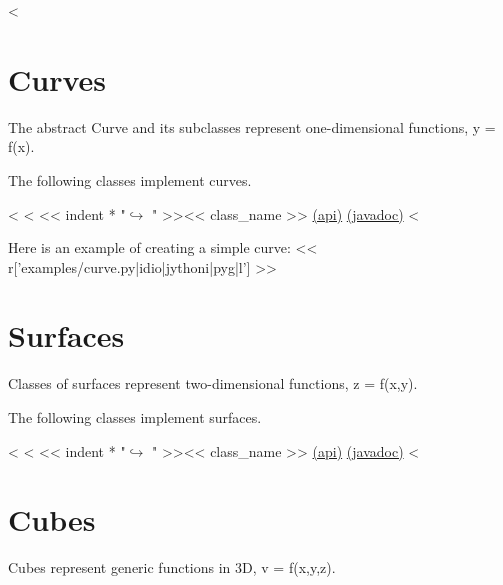 <%

\section{Curves}

The abstract Curve and its subclasses represent one-dimensional functions, y = f(x).

The following classes implement curves.

\begin{fullwidth}
<%
<%
<< indent * "$\hookrightarrow$ " >><< class_name >> \href{http://docs-static.hq.opengamma.com/0.7.0/analytics/api/<< package_name >>.html#class-<<class_name>>}{(api)} \href{http://docs-static.hq.opengamma.com/0.7.0/java/javadocs/<< class_name.replace(".","/") >>.html}{(javadoc)}
<%
\end{fullwidth}

Here is an example of creating a simple curve:
<< r['examples/curve.py|idio|jythoni|pyg|l'] >>

\section{Surfaces}

Classes of surfaces represent two-dimensional functions, z = f(x,y).

The following classes implement surfaces.

\begin{fullwidth}
<%
<%
<< indent * "$\hookrightarrow$ " >><< class_name >> \href{http://docs-static.hq.opengamma.com/0.7.0/analytics/api/<< package_name >>.html#class-<<class_name>>}{(api)} \href{http://docs-static.hq.opengamma.com/0.7.0/java/javadocs/<< class_name.replace(".","/") >>.html}{(javadoc)}
<%
\end{fullwidth}

\section{Cubes}

Cubes represent generic functions in 3D, v = f(x,y,z).

